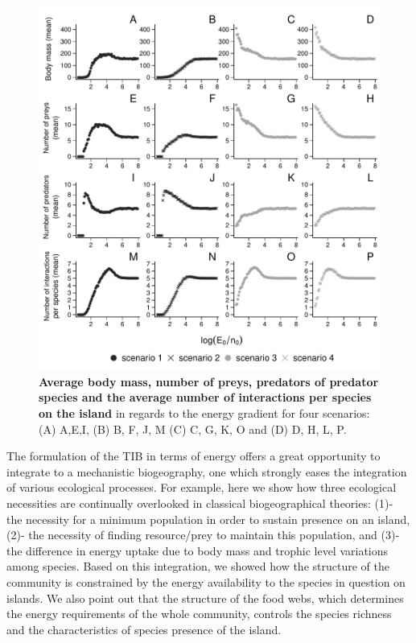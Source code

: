 \begin{figure}[htbp]
\centering
\includegraphics[width=\textwidth]{chapitre4/fig/fig4.pdf}
\caption[Average body mass, number of preys, predators of
predator species and the average number of interactions per species on
the island]{\textbf{Average body mass, number of preys, predators of
predator species and the average number of interactions per species on
the island} in regards to the energy gradient for four scenarios: (A)
A,E,I, (B) B, F, J, M (C) C, G, K, O and (D) D, H, L,
P.\label{fig:etib4}}
\end{figure}

The formulation of the TIB in terms of energy offers a great opportunity
to integrate to a mechanistic biogeography, one which strongly eases the
integration of various ecological processes. For example, here we show
how three ecological necessities are continually overlooked in classical
biogeographical theories: (1)- the necessity for a minimum population in
order to sustain presence on an island, (2)- the necessity of finding
resource/prey to maintain this population, and (3)- the difference in
energy uptake due to body mass and trophic level variations among
species. Based on this integration, we showed how the structure of the
community is constrained by the energy availability to the species in
question on islands. We also point out that the structure of the food
webs, which determines the energy requirements of the whole community,
controls the species richness and the characteristics of species
presence of the island.

